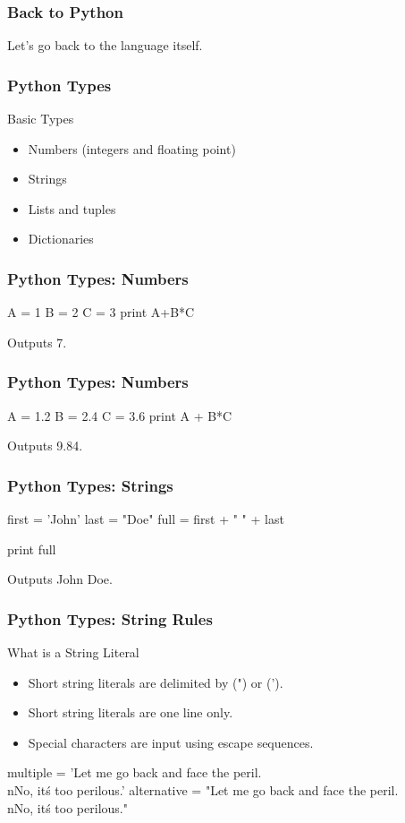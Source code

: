 \begin{frame}[fragile]
\frametitle{Back to Python}
Let's go back to the language itself.
\end{frame}

\begin{frame}[fragile]
\frametitle{Python Types}
\begin{block}{Basic Types}
\begin{itemize}
\item Numbers (integers and floating point)
\item Strings
\item Lists and tuples
\item Dictionaries
\end{itemize}
\end{block}
\end{frame}

\begin{frame}[fragile]
\frametitle{Python Types: Numbers}
\begin{python}
A = 1
B = 2
C = 3
print A+B*C
\end{python}

Outputs 7.
\end{frame}

\begin{frame}[fragile]
\frametitle{Python Types: Numbers}
\begin{python}
A = 1.2
B = 2.4
C = 3.6
print A + B*C
\end{python}

Outputs 9.84.
\end{frame}

\begin{frame}[fragile]
\frametitle{Python Types: Strings}

\begin{python}
first = 'John'
last = "Doe"
full = first + " " + last

print full
\end{python}

\pause
Outputs \alert{John Doe}.
\end{frame}

\begin{frame}[fragile]
\frametitle{Python Types: String Rules}

\begin{block}{What is a String Literal}
\begin{itemize}
\item Short string literals are delimited by (") or (').
\item Short string literals are one line only.
\item Special characters are input using escape sequences.
\end{itemize}
\end{block}

\begin{python}
multiple = 'Let  me go back and face the peril.\\nNo, it\'s too perilous.'
alternative = "Let  me go back and face the peril.\\nNo, it\'s too perilous."
\end{python}
\end{frame}

